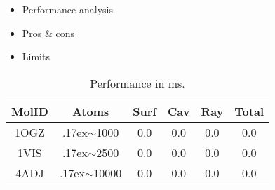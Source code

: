 \begin{itemize}
  \item Performance analysis
  \item Pros \& cons
  \item Limits
\end{itemize}

\def\tweakedsim{\raise.17ex\hbox{$\scriptstyle\sim$}}

\begin{table}
  \caption{Performance in ms.}
  \label{tab:performance}
  \scriptsize
  \begin{center}
    \begin{tabular}{cccccc}
      MolID & Atoms & Surf & Cav & Ray & Total \\
    \hline
      1OGZ &  {\tweakedsim}1000 & 0.0 & 0.0 & 0.0 & 0.0 \\
      1VIS &  {\tweakedsim}2500 & 0.0 & 0.0 & 0.0 & 0.0 \\
      4ADJ & {\tweakedsim}10000 & 0.0 & 0.0 & 0.0 & 0.0
    \end{tabular}
  \end{center}
\end{table}
